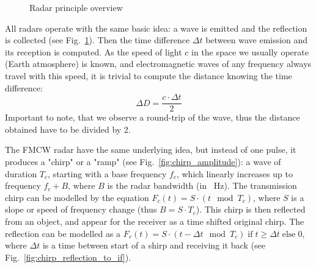 \documentclass{article}
\begin{document}
\begin{figure}[h]
    \centering
    \caption{Radar principle overview}
    \label{fig:radar_principle}
\end{figure}

All radars operate with the same basic idea: a wave is emitted and the reflection is collected (see Fig.~\ref{fig:radar_principle}).
Then the time difference $\Delta t$ between wave emission and its reception is computed.
As the speed of light $c$ in the space we usually operate (Earth atmosphere) is known, and electromagnetic waves of any frequency always travel with this speed, it is trivial to compute the distance knowing the time difference: \[\Delta D = \frac{c \cdot \Delta t}{2}\]
Important to note, that we observe a round-trip of the wave, thus the distance obtained have to be divided by 2.

The FMCW radar have the same underlying idea, but instead of one pulse, it produces a "chirp" or a "ramp" (see Fig.~\ref{fig:chirp_amplitude}): a wave of duration $T_c$, starting with a base frequency $f_c$, which linearly increases up to frequency $f_c + B$, where $B$ is the radar bandwidth (in \SI{}{\hertz}).
The transmission chirp can be modelled by the equation $F_c(t) = S \cdot (t \mod T_c)$, where $S$ is a slope or speed of frequency change (thus $B = S \cdot T_c$).
This chirp is then reflected from an object, and appear for the receiver as a time shifted original chirp.
The reflection can be modelled as a $F_r(t) = S \cdot (t - \Delta t \mod T_c) \;\text{if}\; t \geq \Delta t \;\text{else}\; 0$, where $\Delta t$ is a time between start of a shirp and receiving it back (see Fig.~\ref{fig:chirp_reflection_to_if}).
\end{document}
